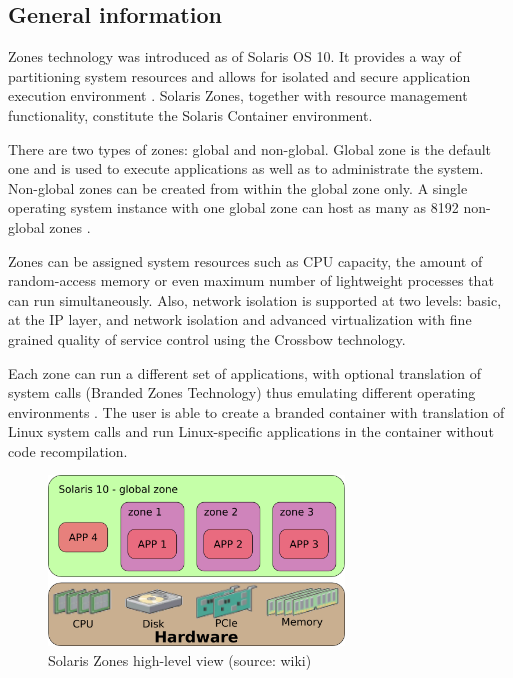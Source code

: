 \documentclass[11pt]{book}
\begin{document}
      \subsection{General information}
      \label{sub:}

        Zones technology was introduced as of Solaris OS 10. It provides a way of partitioning system
        resources and allows for isolated and secure application execution environment \cite{sag}. Solaris Zones,
        together with resource management functionality, constitute the Solaris Container environment.

        There are two types of zones: global and non-global. Global zone is the default one and is used to execute
        applications as well as to administrate the system. Non-global zones can be created from within the global zone
        only. A single operating system instance with one global zone can host as many as 8192 non-global zones \cite{sag}.

        Zones can be assigned system resources such as CPU capacity, the amount of random-access memory or even maximum
        number of lightweight processes that can run simultaneously. Also, network isolation is supported at two levels: basic, at the IP layer, and
        network isolation and advanced virtualization with fine grained quality of service control using the Crossbow technology.

        Each zone can run a different set of applications, with optional translation of system calls
        (Branded Zones Technology) thus emulating different operating
        environments \cite{sag}. The user is able to create a branded container with translation of Linux system calls and run
        Linux-specific applications in the container without code recompilation.

        \begin{figure}[H]
          \begin{center}
            \includegraphics[width=0.7\textwidth]{img/solaris/zones.png}
          \end{center}

          \caption{Solaris Zones high-level view (source: wiki)}
        \end{figure}
\end{document}
